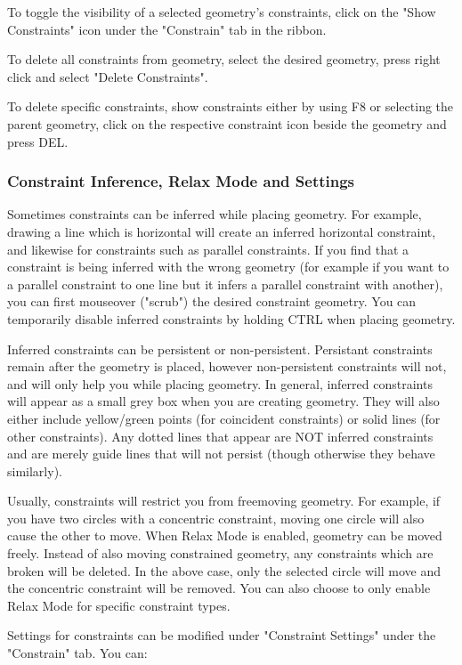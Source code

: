 To toggle the visibility of a selected geometry's constraints, click on the "Show Constraints" icon under the "Constrain" tab in the ribbon.

To delete all constraints from geometry, select the desired geometry, press right click and select "Delete Constraints".

To delete specific constraints, show constraints either by using F8 or selecting the parent geometry, click on the respective constraint icon beside the geometry and press DEL.

\subsubsection{Constraint Inference, Relax Mode and Settings}

Sometimes constraints can be inferred while placing geometry. For example, drawing a line which is horizontal will create an inferred horizontal constraint, and likewise for constraints such as parallel constraints. If you find that a constraint is being inferred with the wrong geometry (for example if you want to a parallel constraint to one line but it infers a parallel constraint with another), you can first mouseover ("scrub") the desired constraint geometry. You can temporarily disable inferred constraints by holding CTRL when placing geometry.

Inferred constraints can be persistent or non-persistent. Persistant constraints remain after the geometry is placed, however non-persistent constraints will not, and will only help you while placing geometry. In general, inferred constraints will appear as a small grey box when you are creating geometry. They will also either include yellow/green points (for coincident constraints) or solid lines (for other constraints). Any dotted lines that appear are NOT inferred constraints and are merely guide lines that will not persist (though otherwise they behave similarly).

Usually, constraints will restrict you from freemoving geometry. For example, if you have two circles with a concentric constraint, moving one circle will also cause the other to move. When Relax Mode is enabled, geometry can be moved freely. Instead of also moving constrained geometry, any constraints which are broken will be deleted. In the above case, only the selected circle will move and the concentric constraint will be removed. You can also choose to only enable Relax Mode for specific constraint types.

Settings for constraints can be modified under "Constraint Settings" under the "Constrain" tab. You can:


